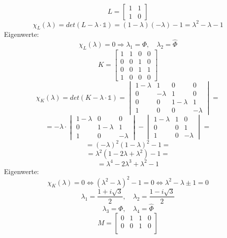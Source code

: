\begin{flushenum}
\item
  \[ L = \begin{bmatrix} 1 & 1 \\ 1 & 0 \end{bmatrix} \]
  \[ \chi_L(\lambda) = det(L - \lambda \cdot \mathds{1}) 
     = (1 - \lambda)(-\lambda) - 1 = \lambda^2 - \lambda - 1 \]
  Eigenwerte:
  \[ \chi_L(\lambda) = 0 \Rightarrow \lambda_1
     = \Phi, \quad \lambda_2 = \hat \Phi \]
     \vspace{2em}
  \[ K = \begin{bmatrix} 1 & 1 & 0 & 0 \\ 0 & 0 & 1 & 0 \\
                         0 & 0 & 1 & 1 \\ 1 & 0 & 0 & 0 \end{bmatrix} \]
  \[ \chi_K(\lambda) = det(K - \lambda \cdot \mathds{1})
     = \begin{vmatrix} 1-\lambda & 1 & 0 & 0 \\
                       0 & -\lambda & 1 & 0 \\
                       0 & 0 & 1-\lambda & 1 \\
                       1 & 0 & 0 & -\lambda \end{vmatrix} = \]
  \[ = -\lambda \cdot \begin{vmatrix} 1-\lambda & 0 & 0 \\ 
                                      0 & 1-\lambda & 1 \\
                                      1 & 0 & -\lambda \end{vmatrix} -
                      \begin{vmatrix} 1-\lambda & 1 & 0 \\
                                      0 & 0 & 1 \\
                                      1 & 0 & -\lambda \end{vmatrix} = \]
  \[ = (-\lambda)^2 (1-\lambda)^2 - 1 = \]
  \[ = \lambda^2 (1 - 2\lambda + \lambda^2) - 1 = \]
  \[ = \lambda^4 - 2\lambda^3 +\lambda^2 - 1 \]
  Eigenwerte:
  \[ \chi_K(\lambda) = 0 \Leftrightarrow (\lambda^2 - \lambda)^2 - 1 
     = 0 \Leftrightarrow \lambda^2 - \lambda \pm 1 = 0 \]
  \[ \lambda_1 = \frac{1 + i\sqrt{3}}{2}, \quad
     \lambda_2 = \frac{1 - i\sqrt{3}}{2} \]
  \[ \lambda_3 = \Phi, \quad \lambda_4 = \hat \Phi \]
     \vspace{2em}
  \[ M = \begin{bmatrix} 0 & 1 & 1 & 0 \\ 0 & 0 & 1 & 0 \\

\end{bmatrix}\]
\end{flushenum}
